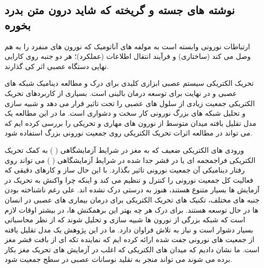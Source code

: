 \subsection*{نوشته های جسته و گریخته که شاید درون متن بدرد بخوره}
ارتباطات نورونی وابسته است به مولفه های آناتومیک که نورون های منفرد را به هم وصل می کند (ساختاری) و فرآیند انتقال اطلاعات (عملکرد)؛ هر دو جنبه روی کارایی نهایی دستگاه عصبی اثر کی گذارند.



تحریک الکتریکی سیستم عصبی ابزاری کلیدی برای درک و مطالعه دینامیک شبکه های عصبی و در نهایت برای توسعه درمان بالینی است. بسیاری از کاربردهای تحریک الکتریکی جمعیت زیادی از سلول های عصبی را تحت تاثیر قرار می دهد و شبیه سازی و تحلیل شبکه های بزرگ نورونی کار سخت و دشواری است. ما در این مطالعه یک مدل تقلیل یافته میدان متوسط از نورون های مهاری و تحریکی 
را بررسی کرده ایم که می تواند در مطالعه اثرات تحریک الکتریکی روی جمعیت نورونی بزرگ استفاده شود. 

ورودی های الکتریکی ضعیف که به مغز در شرایط آزمایشگاهی (
)
به کمک تحریک الکتریکی فراجمجمه ای یا در قشر جدا شده در شرایط آزمایشگاهی (
)
می تواند روی رفتار دینامیکی آن جمعیت نورونی تاثیر بگذارد. با این حال ساز و کارهای دقیقی که فعالیت کل جمعیت نورونی را کنترل و تنظیم می کند و اینکه چرا واکنش به تحریک در آزمایش ها بسیار متنوع هستند، هنوز به درستی درک نشده اند. علی رغم ناشناخته بودن جنبه های مختلف، تکنیک های تحریک الکتریکی برای درمان بیماری های عصبی در انسان ها در حال توسعه هستند. برای درک هر چه بهتر این برهمکنش ها، در بیشتر اوقات لازم است که شبکه بزرگی از نورون ها شبیه سازی و تحلیل شوند که از نظر محاسباتی بسیار دشوار است و نیاز به تلاش فراوان دارد. ما در این پژوهش یک مدل تقلیل یافته از جمعیت های نورونی جفت شده ارائه کرده ایم که نماینده تکه ای از بافت قشر مغز است. ما نشان دادیم که میدان های الکتریکی که اغلب در آزمایش های تحریک مغز بکار برده می شوند می تواند منجر به تقلید
 نوسانات عصبی در سطح جمعیت شود.

